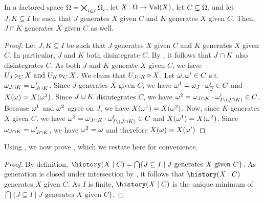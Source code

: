 \documentclass[USenglish,onecolumn]{article}
\begin{document}
\begin{lemma}
\label{lemma:generationintersection}
In a factored space $\Omega=\bigtimes_{i\in I}\Omega_i$, let $X\colon \Omega\to \textnormal{Val}(X)$, let $C\subseteq\Omega$, and let $J,K\subseteq I$ be such that $J$ generates $X$ given $C$ and $K$ generates $X$ given $C$. Then, $J\cap K$ generates $X$ given $C$ as well.
\end{lemma}

\begin{proof}
    Let  $J,K\subseteq I$ be such that $J$ generates $X$ given $C$ and $K$ generates $X$ given $C$. In particular, $J$ and $K$ both disintegrate $C$. By , it follows that $J\cap K$ also disintegrates $C$.
    As both $J$ and $K$ generate $X$ given $C$, we have
    \(U_J\triangleright_C X \text{ and }U_K\triangleright_C X\).
    We claim that $U_{J \cap K} \triangleright X$.
    Let $\omega, \omega' \in C$ s.t. $\omega_{J \cap K} = \omega'_{J \cap K}$.
    Since $J$ generates $X$ given $C$, we have
    $\omega^1 = \omega_{J} \cdot \omega'_{{\overline{J}}} \in C$
    and $X(\omega) = X(\omega^1)$.
    Since $J \cup K$ disintegrates $C$, we have
    $\omega^2 = \omega_{J \cap K} \cdot \omega'_{I \setminus (J \cap K)} \in C$.
    Because $\omega^1$ and $\omega^2$ agree on $J$, we have
    $X(\omega^1) = X(\omega^2)$.
    Now, since $K$ generates $X$ given $C$, we have
    $\omega^2 = \omega_{J \cap K} \cdot \omega'_{I \setminus (J \cap K)} \in C$
    and $X(\omega^1)=X(\omega^2)$.
    Since $\omega_{J \cap K} =\omega'_{J \cap K}$, we have
    $\omega^2 = \omega$ and therefore $X(\omega) = X(\omega')$
    


\end{proof}

Using , we now prove , which we restate here for convenience.

\historygenerates*

\begin{proof}
    By definition, $\history(X\given C)=\bigcap\{J\subseteq I \mid J\text{ generates } X\text{ given }C\}$. As generation is closed under intersection by , it follows that $\history(X\given C)$ generates $X$ given $C$. As $I$ is finite, $\history(X\given C)$ is the unique minimum of $\bigcap\{J\subseteq I \mid J\text{ generates } X\text{ given }C\}$.
\end{proof}
\end{document}
